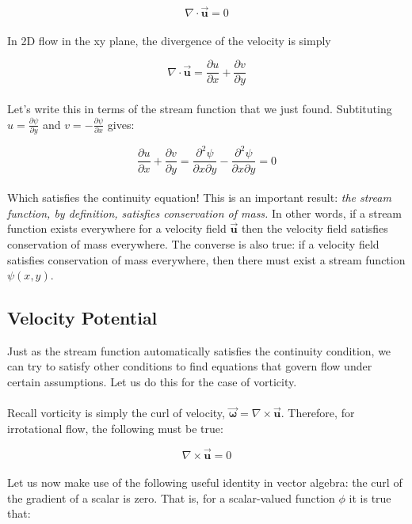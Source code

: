 \documentclass[11pt]{article}
\begin{document}
\begin{equation*}
    \nabla \cdot \vec{\bm{u}} = 0
\end{equation*}\\
\noindent
In 2D flow in the xy plane, the divergence of the velocity is simply

\begin{equation*}
    \nabla \cdot \vec{\bm{u}} = \frac{\partial u}{\partial x} + \frac{\partial v}{\partial y}
\end{equation*}\\ 
\noindent
Let's write this in terms of the stream function that we just found. Subtituting $u = \frac{\partial \psi}{\partial y}$ and $v = -\frac{\partial \psi}{\partial x}$ gives:

\begin{equation*}
    \frac{\partial u}{\partial x} + \frac{\partial v}{\partial y} = \frac{\partial^2\psi}{\partial x \partial y} - \frac{\partial^2\psi}{\partial x \partial y} = 0
\end{equation*} \\ 
\noindent
Which satisfies the continuity equation! This is an important result: \emph{the stream function, by definition, satisfies conservation of mass.} In other words, if a stream function exists everywhere for a velocity field $\vec{\bm{u}}$ then the velocity field satisfies conservation of mass everywhere. The converse is also true: if a velocity field satisfies conservation of mass everywhere, then there must exist a stream function $\psi(x,y)$.

\subsection{Velocity Potential}
Just as the stream function automatically satisfies the continuity condition, we can try to satisfy other conditions to find equations that govern flow under certain assumptions. Let us do this for the case of vorticity.\\ \\
\noindent
Recall vorticity is simply the curl of velocity, $\vec{\bm{\omega}} = \nabla \times \vec{\bm{u}}$. Therefore, for irrotational flow, the following must be true:

\begin{equation*}
    \nabla \times \vec{\bm{u}} = 0
\end{equation*}\\
\noindent
Let us now make use of the following useful identity in vector algebra: the curl of the gradient of a scalar is zero. That is, for a scalar-valued function $\phi$ it is true that:
\end{document}
